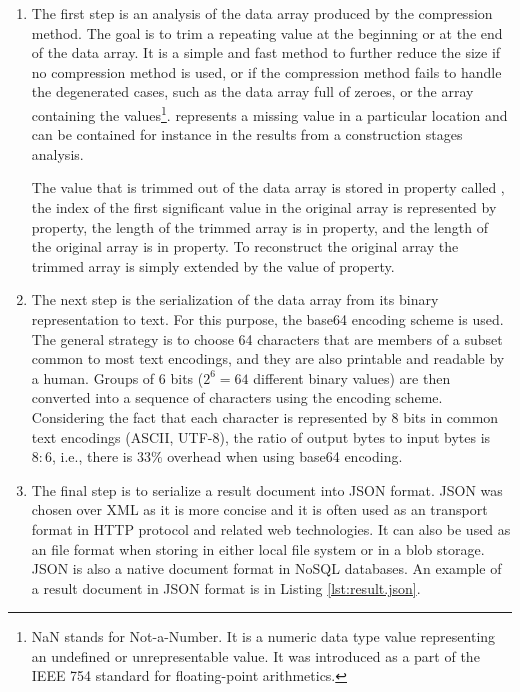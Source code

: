 \begin{enumerate}
    
    \item The first step is an analysis of the data array produced by the compression method. The goal is to trim a repeating value at the beginning or at the end of the data array. It is a simple and fast method to further reduce the size if no compression method is used, or if the compression method fails to handle the degenerated cases, such as the data array full of zeroes, or the array containing the  values\footnote{NaN stands for Not-a-Number. It is a numeric data type value representing an undefined or unrepresentable value. It was introduced as a part of the IEEE 754 standard for floating-point arithmetics.}.  represents a missing value in a particular location and can be contained for instance in the results from a construction stages analysis.

    The value that is trimmed out of the data array is stored in property called , the index of the first significant value in the original array is represented by  property, the length of the trimmed array is in  property, and the length of the original array is in  property. To reconstruct the original array the trimmed array is simply extended by the value of  property.
    
    \item The next step is the serialization of the data array from its binary representation to text. For this purpose, the base64 encoding scheme is used. The general strategy is to choose 64 characters that are members of a subset common to most text encodings, and they are also printable and readable by a human. Groups of 6 bits ($2^6 = 64$ different binary values) are then converted into a sequence of characters using the encoding scheme. Considering the fact that each character is represented by 8 bits in common text encodings (ASCII, UTF-8), the ratio of output bytes to input bytes is $8:6$, i.e., there is $33\%$ overhead when using base64 encoding.
    
    \item The final step is to serialize a result document into JSON format. JSON was chosen over XML as it is more concise and it is often used as an transport format in HTTP protocol and related web technologies. It can also be used as an file format when storing in either local file system or in a blob storage. JSON is also a native document format in NoSQL databases. An example of a result document in JSON format is in Listing \ref{lst:result.json}.

\end{enumerate}

